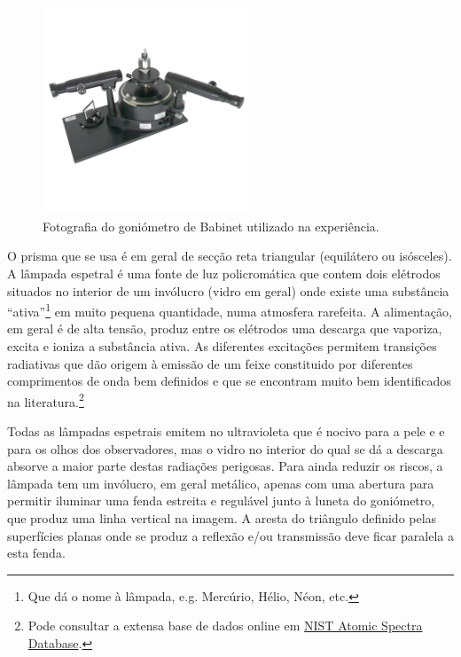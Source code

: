 \documentclass[a4paper,12pt]{article}  %
\begin{document}
\begin{figure}[tb]  
\centering 
	\includegraphics[width=0.55\textwidth]{Espectrometro-Goniometro-S}
	\caption{Fotografia do goniómetro de Babinet utilizado na experiência. \label{fig:spectrometer}} 
\end{figure}




O prisma que se usa é em geral de secção reta triangular (equilátero ou isósceles).
A lâmpada espetral é uma fonte de luz policromática  que contem dois elétrodos situados no interior de um invólucro (vidro em geral) onde existe uma substância “ativa”\footnote{Que dá o nome à lâmpada, e.g. Mercúrio, Hélio, Néon, etc.} em muito pequena quantidade, numa atmosfera rarefeita. A alimentação, em geral é de alta tensão, produz entre os elétrodos uma descarga que vaporiza, excita e ioniza a substância ativa. As diferentes excitações permitem transições radiativas que dão origem à emissão de um feixe constituido por diferentes comprimentos de onda bem definidos e que se encontram muito bem identificados na literatura.\footnote{Pode consultar a extensa base de dados online em  \href{http://physics.nist.gov/asd}{NIST Atomic Spectra Database}.} 

Todas as lâmpadas espetrais emitem no ultravioleta que é nocivo para a pele e e para os olhos dos observadores, mas o vidro no interior do qual se dá a descarga absorve a maior parte destas radiações perigosas. Para ainda reduzir os riscos, a lâmpada tem um invólucro, em geral metálico, apenas com uma abertura para permitir iluminar uma fenda estreita e regulável junto à luneta do goniómetro, que produz uma linha vertical na imagem.  A aresta do triângulo definido pelas superfícies planas onde se produz a reflexão e/ou transmissão deve ficar paralela a esta fenda.
\end{document}
